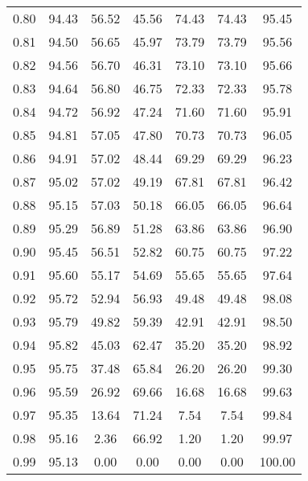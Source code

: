 \begin{tabular}{|c|c|c|c|c|c|c|}
      0.80 &     94.43 &     56.52 &      45.56 &   74.43 &      74.43 &         95.45 \\
      0.81 &     94.50 &     56.65 &      45.97 &   73.79 &      73.79 &         95.56 \\
      0.82 &     94.56 &     56.70 &      46.31 &   73.10 &      73.10 &         95.66 \\
      0.83 &     94.64 &     56.80 &      46.75 &   72.33 &      72.33 &         95.78 \\
      0.84 &     94.72 &     56.92 &      47.24 &   71.60 &      71.60 &         95.91 \\
      0.85 &     94.81 &     57.05 &      47.80 &   70.73 &      70.73 &         96.05 \\
      0.86 &     94.91 &     57.02 &      48.44 &   69.29 &      69.29 &         96.23 \\
      0.87 &     95.02 &     57.02 &      49.19 &   67.81 &      67.81 &         96.42 \\
      0.88 &     95.15 &     57.03 &      50.18 &   66.05 &      66.05 &         96.64 \\
      0.89 &     95.29 &     56.89 &      51.28 &   63.86 &      63.86 &         96.90 \\
      0.90 &     95.45 &     56.51 &      52.82 &   60.75 &      60.75 &         97.22 \\
      0.91 &     95.60 &     55.17 &      54.69 &   55.65 &      55.65 &         97.64 \\
      0.92 &     95.72 &     52.94 &      56.93 &   49.48 &      49.48 &         98.08 \\
      0.93 &     95.79 &     49.82 &      59.39 &   42.91 &      42.91 &         98.50 \\
      0.94 &     95.82 &     45.03 &      62.47 &   35.20 &      35.20 &         98.92 \\
      0.95 &     95.75 &     37.48 &      65.84 &   26.20 &      26.20 &         99.30 \\
      0.96 &     95.59 &     26.92 &      69.66 &   16.68 &      16.68 &         99.63 \\
      0.97 &     95.35 &     13.64 &      71.24 &    7.54 &       7.54 &         99.84 \\
      0.98 &     95.16 &      2.36 &      66.92 &    1.20 &       1.20 &         99.97 \\
      0.99 &     95.13 &      0.00 &       0.00 &    0.00 &       0.00 &        100.00 \\
\bottomrule
\end{tabular}
